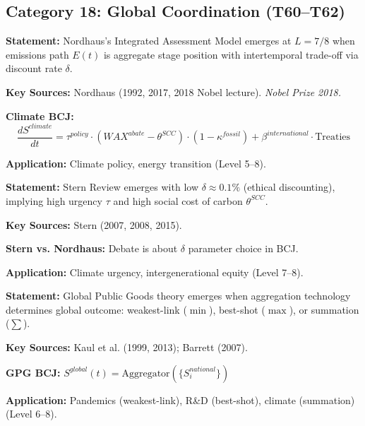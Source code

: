 \subsection{Category 18: Global Coordination (T60--T62)}

\begin{tcolorbox}[colback=blue!5!white, colframe=blue!75!black,
    title=Theorem BCJ-T60: Nordhaus DICE/RICE Climate as Special Case]
\textbf{Statement:} Nordhaus's Integrated Assessment Model emerges at $L=7/8$ when emissions path $E(t)$ is aggregate stage position with intertemporal trade-off via discount rate $\delta$.

\textbf{Key Sources:} Nordhaus (1992, 2017, 2018 Nobel lecture). \textit{Nobel Prize 2018.}

\textbf{Climate BCJ:}
\begin{equation}
\frac{dS^{climate}}{dt} = \tau^{policy} \cdot (WAX^{abate} - \theta^{SCC}) \cdot (1-\kappa^{fossil}) + \beta^{international} \cdot \text{Treaties}
\end{equation}

\textbf{Application:} Climate policy, energy transition (Level 5--8).
\end{tcolorbox}

\begin{tcolorbox}[colback=blue!5!white, colframe=blue!75!black,
    title=Theorem BCJ-T61: Stern Review Climate Economics as Special Case]
\textbf{Statement:} Stern Review emerges with low $\delta \approx 0.1\%$ (ethical discounting), implying high urgency $\tau$ and high social cost of carbon $\theta^{SCC}$.

\textbf{Key Sources:} Stern (2007, 2008, 2015).

\textbf{Stern vs. Nordhaus:} Debate is about $\delta$ parameter choice in BCJ.

\textbf{Application:} Climate urgency, intergenerational equity (Level 7--8).
\end{tcolorbox}

\begin{tcolorbox}[colback=blue!5!white, colframe=blue!75!black,
    title=Theorem BCJ-T62: Global Public Goods as Special Case]
\textbf{Statement:} Global Public Goods theory emerges when aggregation technology determines global outcome: weakest-link ($\min$), best-shot ($\max$), or summation ($\sum$).

\textbf{Key Sources:} Kaul et al. (1999, 2013); Barrett (2007).

\textbf{GPG BCJ:} $S^{global}(t) = \text{Aggregator}(\{S_i^{national}\})$

\textbf{Application:} Pandemics (weakest-link), R\&D (best-shot), climate (summation) (Level 6--8).
\end{tcolorbox}

